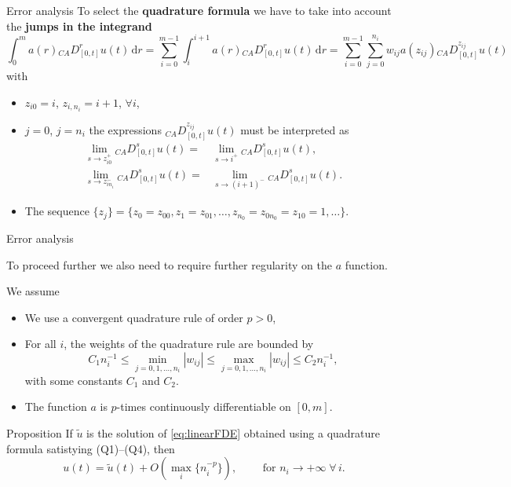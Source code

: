 \documentclass[aspectratio=169,xcolor=dvipsnames]{beamer}
\begin{document}
\begin{frame}{Error analysis}
To select the \textbf{quadrature formula} we have to take into account the \textbf{jumps in the integrand}
\[
\int_{0}^{m} a(r) {}_{CA}D^r_{[0,t]}u(t)\,\mathrm{d}r = \sum_{i=0}^{m-1} \int_{i}^{i+1} a(r) {}_{CA}D^r_{[0,t]}u(t)\,\mathrm{d}r = \sum_{i=0}^{m-1} \sum_{j=0}^{n_i} w_{ij} a(z_{ij}) {}_{CA}D^{z_{ij}}_{[0,t]}u(t)
\]
with
\begin{itemize}
	\item[\faCog]<1-> $z_{i0} = i$, $z_{i,n_i} = i+1$, $\forall i$,
	\item[\faCog]<2-> $j=0$, $j=n_{i}$ the expressions ${}_{CA}D^{z_{ij}}_{[0,t]}u(t)$ must be interpreted as
	\begin{align*}
	\lim_{s \rightarrow z_{i0}^+} {}_{CA}D^{s}_{[0,t]}u(t) = & \lim_{s \rightarrow i^+} {}_{CA}D^{s}_{[0,t]}u(t), \\
	\lim_{s \rightarrow z_{in_i}^-} {}_{CA}D^{s}_{[0,t]}u(t) = & \lim_{s \rightarrow (i+1)^-} {}_{CA}D^{s}_{[0,t]}u(t).
	\end{align*}
	\item[\faCog]<3-> The sequence $\{z_j\} = \{ z_0 = z_{00}, z_{1} = z_{01}, \ldots, z_{n_0} = z_{0n_0} = z_{10} = 1, \ldots \}$.
\end{itemize}

\end{frame}

\begin{frame}{Error analysis}

To proceed further we also need to require further regularity on the $a$ function. 

We assume
\begin{itemize}
\item[(Q1)] We use a convergent quadrature rule of order $p > 0$,
\item[(Q2)] For all $i$, the weights of the quadrature rule are bounded by
\[
C_1 n_i^{-1} \leq \min_{j=0,1,\ldots,n_i} |w_{ij}| \leq \max_{j=0,1,\ldots,n_i} |w_{ij}| \leq C_2 n_i^{-1},
\]
with some constants $C_1$ and $C_2$.
\item[(Q3)] The function $a$ is \alert{$p$-times continuously differentiable} on $[0,m]$.
\end{itemize}

\begin{alertblock}{Proposition \parencite{DIETHELM200996}}
If $\tilde{u}$ is the solution of \eqref{eq:linearFDE} obtained using a quadrature formula satistying (Q1)--(Q4), then
\[
u(t) = \tilde{u}(t) + O( \max_{i} \{ n_i^{-p} \} ), \qquad \text{ for } n_i \rightarrow +\infty \; \forall\,i. 
\]
\end{alertblock}

\end{frame}
\end{document}
